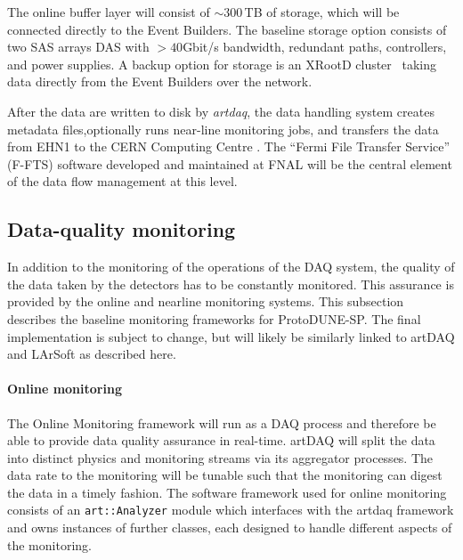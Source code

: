 The online buffer layer will consist of $\sim$300\,TB of storage,
which will be connected directly to the Event Builders.  The baseline
storage option consists of two SAS arrays DAS with $>40$Gbit/s bandwidth,
redundant paths, controllers, and power supplies.
A backup option for storage is an XRootD cluster~\cite{xrootd} taking
data directly from the Event Builders over the network.

After the data are written to disk by {\it artdaq}, the data handling
system creates metadata files,optionally  runs near-line monitoring jobs, and
transfers the data from EHN1 to the CERN Computing Centre \cite{docdb1212}.
The ``Fermi File Transfer Service'' (F-FTS) software 
developed and maintained at FNAL will be the central element
of the data flow management at this level.


\subsection{Data-quality monitoring}

In addition to the monitoring of the operations of the DAQ system, the
quality of the data taken by the detectors has to be constantly monitored.
This assurance is provided by the online and nearline monitoring systems.
This subsection describes the baseline monitoring frameworks for ProtoDUNE-SP.  
The final implementation is subject to change, but will likely be similarly
linked to artDAQ and LArSoft as described here.

\paragraph{Online monitoring}
The Online Monitoring framework will run as a DAQ process and therefore be
able to provide data quality assurance in real-time. artDAQ will split the  
data into distinct physics and monitoring streams via its aggregator processes.  
The data rate to the monitoring will be tunable such that the monitoring 
can digest the data in a timely fashion.
The software framework used for online monitoring 
consists of an
\texttt{art::Analyzer} module which interfaces with the artdaq framework and
owns instances of further classes, each designed to handle different aspects
of the monitoring.  

